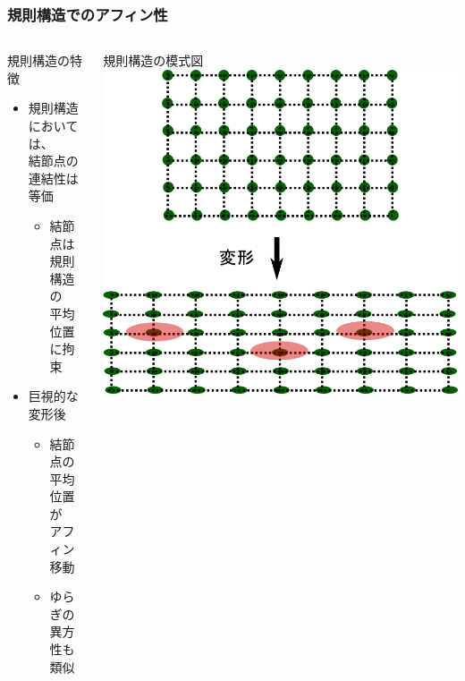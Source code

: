 \documentclass[12pt, dvipdfmx]{beamer}
\begin{document}
\begin{frame}
	\frametitle{規則構造でのアフィン性}
		\begin{columns}[totalwidth=\linewidth]
				\begin{block}{規則構造の特徴}
					\begin{itemize}
						\item 規則構造においては、\\結節点の\alert{連結性は等価}
							\begin{itemize}
								\item 結節点は規則構造の\\平均位置に拘束
							\end{itemize}
						\item 巨視的な変形後
							\begin{itemize}
								\item 結節点の\alert{平均位置が\\アフィン移動}
								\item ゆらぎの異方性も類似
							\end{itemize}
					\end{itemize}
				\end{block}
				規則構造の模式図
				\vspace{3mm}
				\includegraphics[width=\columnwidth]{reglar_NW_2.png}
		\end{columns}
\end{frame}
\end{document}
